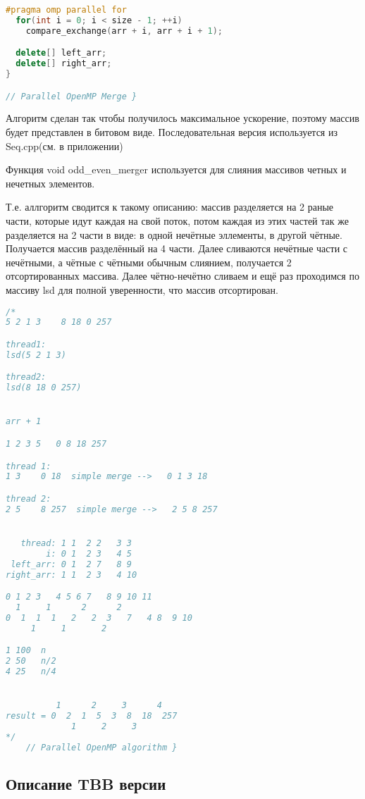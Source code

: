 \documentclass[a4paper,final]{report}
\begin{document}
\begin{spacing}{1.5}
\begin{lstlisting}[language=C++]
  #pragma omp parallel for
  for(int i = 0; i < size - 1; ++i)
    compare_exchange(arr + i, arr + i + 1);

  delete[] left_arr;
  delete[] right_arr;
}

// Parallel OpenMP Merge }
\end{lstlisting}
		\par  Алгоритм сделан так чтобы получилось максимальное ускорение, поэтому массив будет представлен в битовом виде. Последовательная версия используется из Seq.cpp(см. в приложении)
		
		
		\par Функция void odd\_even\_merger используется для  слияния массивов четных и нечетных элементов.
		\par Т.е. аллгоритм сводится к такому описанию: массив разделяется на 2 раные части, которые идут каждая на свой поток, потом каждая из этих частей так же разделяется на 2 части в виде: в одной нечётные эллементы, в другой чётные. Получается массив разделённый на 4 части. Далее сливаются нечётные части с нечётными, а чётные с чётными обычным слиянием, получается 2 отсортированных массива. Далее чётно-нечётно сливаем и ещё раз проходимся по массиву lsd для полной уверенности, что массив отсортирован.
			\begin{spacing}{0}
\end{spacing}

\begin{lstlisting}[language=C++]
		/*
5 2 1 3    8 18 0 257

thread1:
lsd(5 2 1 3)

thread2:
lsd(8 18 0 257)


arr + 1

1 2 3 5   0 8 18 257

thread 1:
1 3    0 18  simple merge -->   0 1 3 18

thread 2:
2 5    8 257  simple merge -->   2 5 8 257


   thread: 1 1  2 2   3 3
        i: 0 1  2 3   4 5
 left_arr: 0 1  2 7   8 9
right_arr: 1 1  2 3   4 10

0 1 2 3   4 5 6 7   8 9 10 11
  1     1      2      2
0  1  1  1   2   2  3   7   4 8  9 10
     1     1       2

1 100  n
2 50   n/2
4 25   n/4


          1      2     3      4
result = 0  2  1  5  3  8  18  257
             1     2     3
*/
	// Parallel OpenMP algorithm }
\end{lstlisting}	
		\subsection{Описание TBB версии}
		

\end{spacing}
\end{document}
